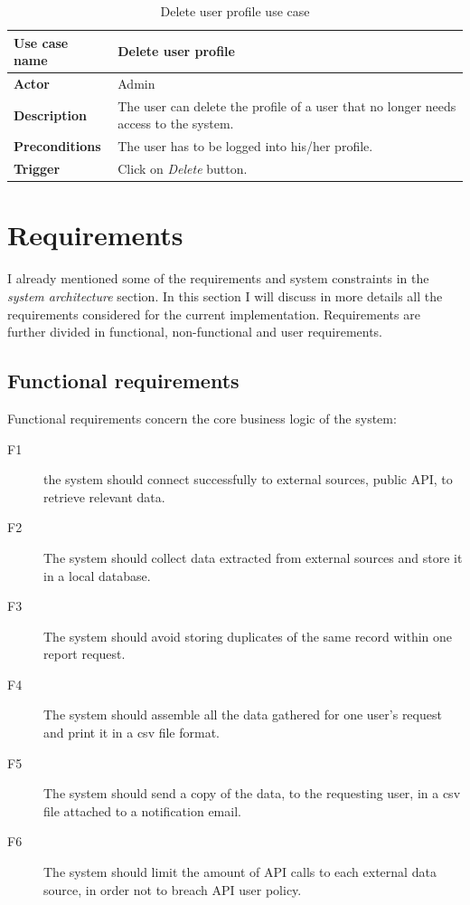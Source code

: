 \begin{table}[H]
\centering
\begin{tabular}{l p{9cm}}  
\toprule
\bf{Use case name}    & Delete user profile \\
\midrule
\bf{Actor}    & Admin \\
\midrule
\bf{Description}    & The user can delete the profile of a user that no longer
needs access to the system.
\\
\midrule
\bf{Preconditions}    & The user has to be logged into his/her profile.
\\
\midrule
\bf{Trigger}    & Click on \emph{Delete} button. \\
\bottomrule
\end{tabular}
\caption{Delete user profile use case}
\end{table}

\section{Requirements}
I already mentioned some of the requirements and system constraints in the
\emph{system architecture} section. In this section I will discuss in more
details all the requirements considered for the current implementation.
Requirements are further divided in functional, non-functional and user
requirements.

\subsection{Functional requirements}
Functional requirements concern the core business logic of the system:
\begin{description}
\item[F1] the system should connect successfully to external sources, public
API, to retrieve relevant data.
\item[F2] The system should collect data extracted from external sources and
store it in a local database.
\item[F3] The system should avoid storing duplicates of the same record within
one report request.
\item[F4] The system should assemble all the data gathered for one user's
request and print it in a csv file format.
\item[F5] The system should send a copy of the data, to the requesting user, in
a csv file attached to a notification email.
\item[F6] The system should limit the amount of API calls to each external data
source, in order not to breach API user policy.
\end{description}

